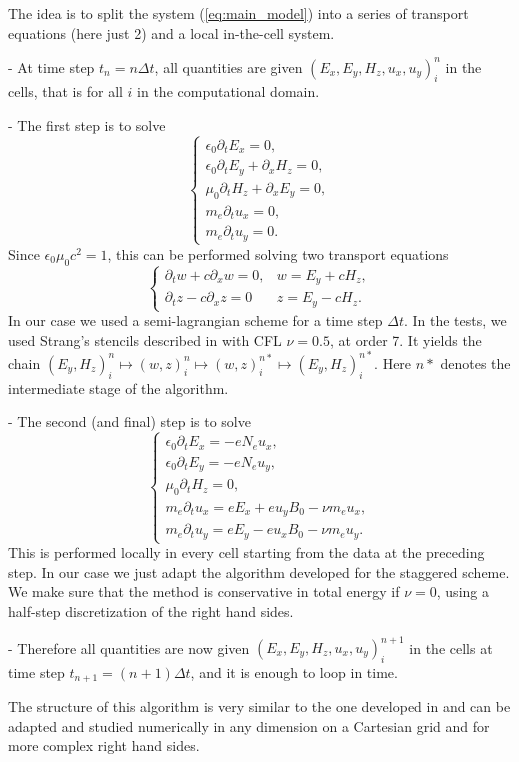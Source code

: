 The idea is to split 
the system (\ref{eq:main_model})
into a series of  transport equations (here just 2) and a local in-the-cell system. 

- At time step $t_n=n\Delta t$, all quantities are given $(E_x,E_y, H_z, u_x,u_y)_{i}^n$ in the cells, that is for all $i$ in the 
computational domain.

- The first step is to solve 
$$
\left\{
\begin{array}{lll}
\epsilon_0\partial_t E_{x}=0,\\
\epsilon_0\partial_t E_{y}+\partial_x H_z=0,\\
\mu_0\partial_t H_z+\partial_x E_y=0,\\
m_e\partial_t u_x=0,\\
m_e\partial_t u_y=0.
\end{array}
\right.
$$
Since  $\epsilon_0 \mu_0c^2=1$, this can be  performed solving
two transport equations 
$$
\left\{
\begin{array}{lll}
\partial_t w +c \partial_x w=0, & w=E_{y}+ c H_z,  \\
\partial_t z -c \partial_x z=0& z=E_{y}-  c H_z.
\end{array}
\right.
$$
In our case we used 
a semi-lagrangian scheme for a time step $\Delta t$.
In the tests, we used Strang's stencils described in \cite{cedar} with CFL $\nu=0.5$, at order 7. 
It  yields the chain 
$(E_y,H_z)_i^n\mapsto ( w,z)_i^n\mapsto ( w,z)_i^{n*}\mapsto (E_y,H_z)_i^{n*} $.
Here $n*$ denotes the intermediate stage of the algorithm.

- The second (and final) step is to solve
$$
\left\{\begin{array}{l}
\epsilon_0\partial_t E_{x}=-eN_e u_x,\\
\epsilon_0\partial_t E_{y}=-eN_e u_y,\\
\mu_0\partial_t H_z=0,\\
m_e\partial_t u_x=eE_x+eu_yB_0-\nu m_e u_x,\\
m_e\partial_t u_y=eE_y-eu_xB_0-\nu m_e u_y.
\end{array}
\right.$$
This is performed locally in every cell starting from the data at the preceding 
step. In our case we just adapt the algorithm developed for the staggered scheme.
We make sure that the method is conservative in total energy if $\nu=0$, using a half-step discretization
of the right hand sides.

- Therefore  all quantities are now given $(E_x,E_y, H_z, u_x,u_y)_{i}^{n+1}$ in the cells 
at time step $t_{n+1}=(n+1)\Delta t$, and it is enough to loop in time.


\begin{remark}
	The structure of this algorithm is very similar to the one developed in \cite{compfluids} and can be adapted and studied numerically
	in any dimension on a Cartesian grid and for more complex right hand sides.
\end{remark}
